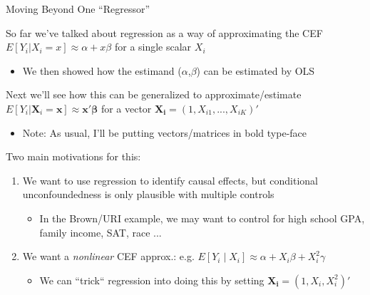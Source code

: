 \documentclass[11pt,english,handout]{beamer}
\newenvironment{wideitemize}{\itemize\addtolength{\itemsep}{10pt}}{\enditemize}
\begin{document}
	\begin{frame}{Moving Beyond One ``Regressor''}
		\begin{wideitemize}
			
			\item
			So far we've talked about regression as a way of approximating the CEF $E[Y_i|X_i =x ] \approx \alpha + x \beta $ for a single scalar $X_i$\smallskip
			\begin{itemize}
					\item 
					We then showed how the estimand ($\alpha$,$\beta$) can be estimated by OLS
				\end{itemize}
			
			\pause
			\item
			Next we'll see how this can be generalized to approximate/estimate $E[Y_i| \mathbf{X}_i =\mathbf{x} ] \approx \mathbf{x}' \bm{\beta}$ for a vector $ \mathbf{X_i} = (1,X_{i1},...,X_{iK})'$ 
				\begin{itemize}\smallskip
					\item 
					Note: As usual, I'll be putting vectors/matrices in bold type-face
				\end{itemize}
			
			\pause
			\item
			Two main motivations for this: \medskip
			\end{wideitemize}	

			\pause
\begin{enumerate}
			\item
			We want to use regression to identify causal effects, but conditional unconfoundedness is only plausible with multiple controls \smallskip
			\begin{itemize}
				\item 
				In the Brown/URI example, we may want to control for high school GPA, family income, SAT, race ...
			\end{itemize}
			\medskip
			
			\pause
			\item
			We want a \emph{nonlinear} CEF approx.: e.g. $E[Y_i\mid X_i]\approx\alpha+X_i\beta+X_i^2\gamma$ \smallskip
			\begin{itemize}
			\item We can ``trick`` regression into doing this by setting $\mathbf{X_i} = (1, X_{i}, X_{i}^2)'$
			\end{itemize}
			\end{enumerate}
			
		
		
	\end{frame}
	
\end{document}
